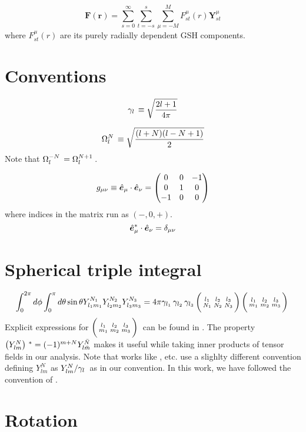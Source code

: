 \begin{equation}
\mathbf{F}(\mathbf{r}) = \sum_{s=0}^{\infty} \sum_{t=-s}^{s}\sum_{\mu=-M}^{M} F_{st}^{\mu}(r) \mathbf{Y}_{st}^{\mu}
\end{equation}
where $F_{st}^{\mu}(r)$ are its purely radially dependent GSH components.
\section{Conventions}
\begin{equation}
\gamma_{l}\, \equiv \sqrt{\frac{2l+1}{4\pi}}
\end{equation}

\begin{equation}
\Omega_{l}^{N}\, \equiv \sqrt{\frac{(l+N)(l-N+1)}{2}}
\end{equation}
Note that $\Omega_{l}^{-N}\, = \Omega_{l}^{N+1}\,$.

\begin{equation}
g_{\mu\nu} \equiv \hat{\bm{e}}_{\mu}\cdot \hat{\bm{e}}_{\nu} = \left( \begin{matrix}
0 & 0 & -1 \\
0 & 1& 0  \\
-1 & 0 & 0
\end{matrix} \right)
\end{equation}
where indices in the matrix run as $(-,0,+)$.
\begin{equation}
\hat{\bm{e}}_{\mu}^* \cdot \hat{\bm{e}}_{\nu} = \delta_{\mu\nu}
\end{equation}

\section{Spherical triple integral}
\begin{equation}
\int_0^{2\pi} d\phi \int_{0}^{\pi} d\theta\sin\theta Y_{l_1m_1}^{N_1}Y_{l_2m_2}^{N_2}Y_{l_3m_3}^{N_3} = 4\pi \gamma_{l_1}\,\gamma_{l_2}\,\gamma_{l_3}\, \bigg(\begin{smallmatrix} l_1 & l_2 & l_3 \\N_1 & N_2 & N_3 \end{smallmatrix}\bigg)\, \bigg(\begin{smallmatrix} l_1 & l_2 & l_3 \\m_1 & m_2 & m_3 \end{smallmatrix}\bigg)\,
\end{equation}
Explicit expressions for $\bigg(\begin{smallmatrix} l_1 & l_2 & l_3 \\m_1 & m_2 & m_3 \end{smallmatrix}\bigg)\,$ can be found in \cite{DT98}. The property $\left( Y_{lm}^{N} \right)\,^* = (-1)^{m+N}Y_{l\bar{m}}^{\bar{N}}$ makes it useful while taking inner products of tensor fields in our analysis.
Note that works like \cite{lavely92}, \cite{hanasoge17} etc. use a slighlty different convention defining $Y_{lm}^{N}$ as $Y_{lm}^{N}/\gamma_{l}\,$ as in our convention. In this work, we have followed the convention of \cite{DT98}.
\section{Rotation}

